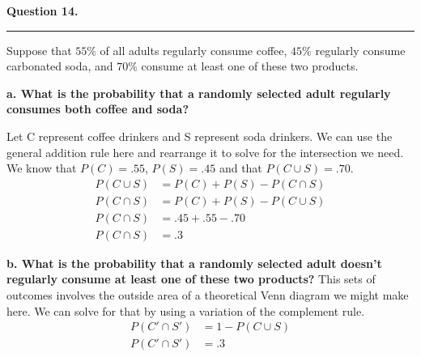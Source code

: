 \textbf{Question 14.} \\
\hrule 

Suppose that $55\%$ of all adults regularly consume coffee, $45\%$ regularly consume carbonated soda, and $70\%$ consume at least one of these two products. \newline 

\textbf{a. What is the probability that a randomly selected adult regularly consumes both coffee and soda?}

Let C represent coffee drinkers and S represent soda drinkers. We can use the general addition rule here and rearrange it to solve for the intersection we need. We know that $P(C) = .55$, $P(S) = .45$ and that $P(C \cup S) = .70$.
\begin{align*}
    P(C \cup S) &= P(C) + P(S) - P(C \cap S) \\
    P(C \cap S) &= P(C) + P(S) - P(C \cup S) \\ 
    P(C \cap S) &= .45 + .55 - .70 \\
    P(C \cap S) &= .3
\end{align*}

\textbf{b. What is the probability that a randomly selected adult doesn't regularly consume at least one of these two products?} \newline 
This sets of outcomes involves the outside area of a theoretical Venn diagram we might make here. We can solve for that by using a variation of the complement rule.
\begin{align*}
    P(C' \cap S') &= 1 - P(C \cup S) \\
    P(C' \cap S') &= .3
\end{align*}